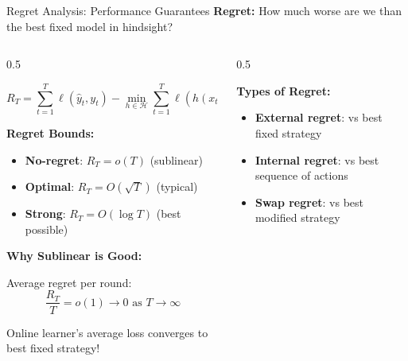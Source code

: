 \begin{frame}{Regret Analysis: Performance Guarantees}
\textbf{Regret:} How much worse are we than the best fixed model in hindsight?

\begin{columns}
\begin{column}{0.5\textwidth}
\begin{definition}[Regret]
\[R_T = \sum_{t=1}^T \ell(\hat{y}_t, y_t) - \min_{h \in \mathcal{H}} \sum_{t=1}^T \ell(h(x_t), y_t)\]
\end{definition}

\textbf{Regret Bounds:}
\begin{itemize}
\item \textbf{No-regret}: $R_T = o(T)$ (sublinear)
\item \textbf{Optimal}: $R_T = O(\sqrt{T})$ (typical)
\item \textbf{Strong}: $R_T = O(\log T)$ (best possible)
\end{itemize}

\vspace{0.3cm}
\textbf{Why Sublinear is Good:}

Average regret per round:
\[\frac{R_T}{T} = o(1) \to 0 \text{ as } T \to \infty\]

Online learner's average loss converges to best fixed strategy!
\end{column}
\begin{column}{0.5\textwidth}
\begin{figure}
\centering
{}
\end{figure}

\textbf{Types of Regret:}
\begin{itemize}
\item \textbf{External regret}: vs best fixed strategy
\item \textbf{Internal regret}: vs best sequence of actions
\item \textbf{Swap regret}: vs best modified strategy
\end{itemize}


\end{column}
\end{columns}
\end{frame}
